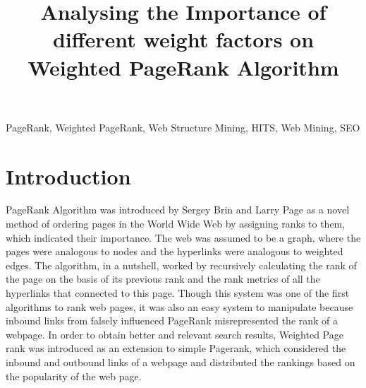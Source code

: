 \documentclass[conference]{IEEEtran}
\begin{document}
\title{Analysing the Importance of different weight factors on Weighted PageRank Algorithm}
\author{

\and
{}

\and
{}
}

\maketitle

\begin{abstract}
\blindtext[1]
\end{abstract}


\begin{IEEEkeywords}
PageRank, Weighted PageRank, Web Structure Mining, HITS, Web Mining, SEO
\end{IEEEkeywords}

\IEEEpeerreviewmaketitle



\section{Introduction}
PageRank Algorithm was introduced by Sergey Brin and Larry Page as a novel method of ordering pages in the World Wide Web by assigning ranks to them, which indicated their importance. The web was assumed to be a graph, where the pages were analogous to nodes and the hyperlinks were analogous to weighted edges. The algorithm, in a nutshell, worked by recursively calculating the rank of the page on the basis of its previous rank and the rank metrics of all the hyperlinks that connected to this page. Though this system was one of the first algorithms to rank web pages, it was also an easy system to manipulate because inbound links from falsely influenced PageRank misrepresented the rank of a webpage. In order to obtain better and relevant search results, Weighted Page rank was introduced as an extension to simple Pagerank, which considered the inbound and outbound links of a webpage and distributed the rankings based on the popularity of the web page.
\end{document}
